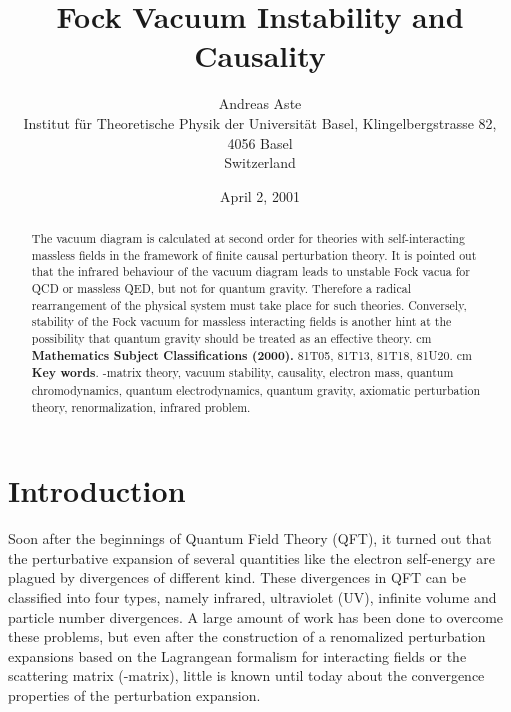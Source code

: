 \documentclass[a4paper,11pt]{article}
\begin{document}
\title{Fock Vacuum Instability and Causality}

\author{Andreas Aste\\ 
Institut f\"ur Theoretische Physik der Universit\"at Basel,
Klingelbergstrasse 82, 4056 Basel\\
Switzerland}
\date{April 2, 2001}

\maketitle
 

\begin{abstract}
The vacuum diagram is calculated at second order for
theories with self-interacting massless fields
in the framework of finite causal perturbation theory. It is
pointed out that the infrared behaviour of the vacuum diagram leads
to unstable Fock vacua for QCD or massless QED, but not for
quantum gravity.
Therefore a radical rearrangement of the physical system
must take place for such theories. Conversely, stability of the
Fock vacuum for massless interacting fields
is another hint at the possibility that
quantum gravity should be treated as an effective theory.
 cm
{\bf Mathematics Subject Classifications (2000).}
81T05, 81T13, 81T18, 81U20.
 cm
{\bf Key words}. \coordHE{}-matrix theory, vacuum stability, causality, electron mass,
quantum chromodynamics, quantum electrodynamics, quantum gravity,
axiomatic perturbation theory, renormalization, infrared problem.
\end{abstract}

\newpage

\section{Introduction}
Soon after the beginnings of Quantum Field Theory (QFT), it turned out that the
perturbative expansion of several quantities like the electron self-energy
are plagued by divergences of different kind. These divergences
in QFT can be classified into four types, namely infrared, ultraviolet (UV),
infinite volume and particle number divergences.
A large amount of work has
been done to overcome these problems, but even after the construction
of a renomalized perturbation expansions based on the Lagrangean formalism
for interacting fields or the scattering matrix
(\coordHE{}-matrix), little is known until today about the
convergence properties of the perturbation expansion.
\end{document}
